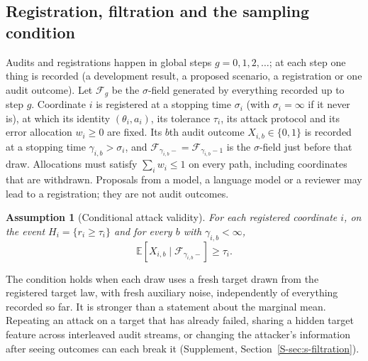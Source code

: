 \documentclass{jpc}
\newtheorem{assumption}[thm]{Assumption}
\theoremstyle{remark}
\newcommand{\E}{\mathbb E}
\newcommand{\F}{\mathcal F}
\begin{document}
\subsection{Registration, filtration and the sampling condition}
Audits and registrations happen in global steps $g=0,1,2,\ldots$; at each step one thing is recorded (a development result, a proposed scenario, a registration or one audit outcome). Let $\F_g$ be the $\sigma$-field generated by everything recorded up to step $g$. Coordinate $i$ is registered at a stopping time $\sigma_i$ (with $\sigma_i=\infty$ if it never is), at which its identity $(\theta_i,a_i)$, its tolerance $\tau_i$, its attack protocol and its error allocation $w_i\ge0$ are fixed. Its $b$th audit outcome $X_{i,b}\in\{0,1\}$ is recorded at a stopping time $\gamma_{i,b}>\sigma_i$, and $\F_{\gamma_{i,b}-}=\F_{\gamma_{i,b}-1}$ is the $\sigma$-field just before that draw. Allocations must satisfy $\sum_iw_i\le1$ on every path, including coordinates that are withdrawn. Proposals from a model, a language model or a reviewer may lead to a registration; they are not audit outcomes.

\begin{assumption}[Conditional attack validity]\label{ass:law}
For each registered coordinate $i$, on the event $H_i=\{r_i\ge\tau_i\}$ and for every $b$ with $\gamma_{i,b}<\infty$,
\begin{equation}\label{eq:conditional}
\E[X_{i,b}\mid\F_{\gamma_{i,b}-}]\ge\tau_i .
\end{equation}
\end{assumption}
The condition holds when each draw uses a fresh target drawn from the registered target law, with fresh auxiliary noise, independently of everything recorded so far. It is stronger than a statement about the marginal mean. Repeating an attack on a target that has already failed, sharing a hidden target feature across interleaved audit streams, or changing the attacker's information after seeing outcomes can each break it (Supplement, Section~\ref{S-sec:s-filtration}).
\end{document}
